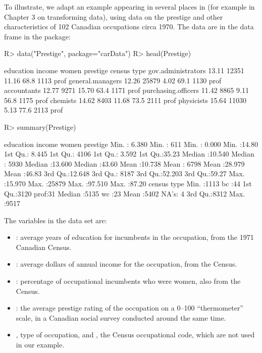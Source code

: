 \documentclass[
]{jss}
\providecommand{\tightlist}{%
  \setlength{\itemsep}{0pt}\setlength{\parskip}{0pt}}
\begin{document}
To illustrate, we adapt an example appearing in several places in
\citet{FoxWeisberg:2019} (for example in Chapter 3 on transforming
data), using data on the prestige and other characteristics of 102
Canadian occupations circa 1970. The data are in the 
data frame in the  package:

\begin{CodeChunk}
\begin{CodeInput}
R> data("Prestige", package="carData")
R> head(Prestige)
\end{CodeInput}
\begin{CodeOutput}
                    education income women prestige census type
gov.administrators      13.11  12351 11.16     68.8   1113 prof
general.managers        12.26  25879  4.02     69.1   1130 prof
accountants             12.77   9271 15.70     63.4   1171 prof
purchasing.officers     11.42   8865  9.11     56.8   1175 prof
chemists                14.62   8403 11.68     73.5   2111 prof
physicists              15.64  11030  5.13     77.6   2113 prof
\end{CodeOutput}
\begin{CodeInput}
R> summary(Prestige)
\end{CodeInput}
\begin{CodeOutput}
   education          income          women           prestige    
 Min.   : 6.380   Min.   :  611   Min.   : 0.000   Min.   :14.80  
 1st Qu.: 8.445   1st Qu.: 4106   1st Qu.: 3.592   1st Qu.:35.23  
 Median :10.540   Median : 5930   Median :13.600   Median :43.60  
 Mean   :10.738   Mean   : 6798   Mean   :28.979   Mean   :46.83  
 3rd Qu.:12.648   3rd Qu.: 8187   3rd Qu.:52.203   3rd Qu.:59.27  
 Max.   :15.970   Max.   :25879   Max.   :97.510   Max.   :87.20  
     census       type   
 Min.   :1113   bc  :44  
 1st Qu.:3120   prof:31  
 Median :5135   wc  :23  
 Mean   :5402   NA's: 4  
 3rd Qu.:8312            
 Max.   :9517            
\end{CodeOutput}
\end{CodeChunk}

The variables in the  data set are:

\begin{itemize}
\tightlist
\item
  : average years of education for incumbents in the
  occupation, from the 1971 Canadian Census.
\item
  : average dollars of annual income for the occupation,
  from the Census.
\item
  : percentage of occupational incumbents who were women,
  also from the Census.
\item
  : the average prestige rating of the occupation on a
  0--100 ``thermometer'' scale, in a Canadian social survey conducted
  around the same time.
\item
  , type of occupation, and , the Census
  occupational code, which are not used in our example.
\end{itemize}
\end{document}
